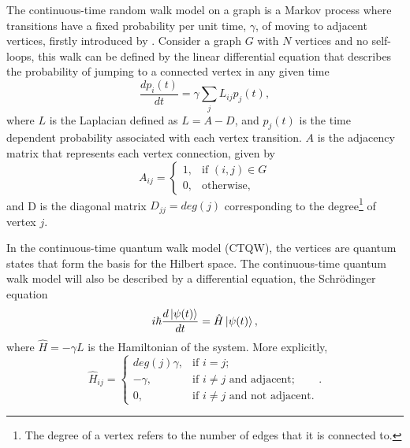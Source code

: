 \documentclass[../../dissertation.tex]{subfiles}
\begin{document}
The continuous-time random walk model on a graph is a Markov process where
transitions have a fixed probability per unit time, $\gamma$, of moving to
adjacent vertices, firstly introduced by \cite{montrollweiss1965}. Consider a
graph $G$ with $N$ vertices and no self-loops, this walk can be defined by the
linear differential equation that describes the probability of jumping to a
connected vertex in any given time 
\begin{equation}
	\frac{dp_i(t)}{dt} = \gamma \sum_j L_{ij} p_j(t), \label{eq:classicalContWalk}
\end{equation}
where $L$ is the Laplacian defined as $L = A - D$, and $p_j(t)$ is the time
dependent probability associated with each vertex transition. $A$ is the
adjacency matrix that represents each vertex connection, given by
\begin{equation}
	A_{ij} = \begin{cases} 1, & \mbox{if } (i,j)\in G \\ 0, & \mbox{otherwise,} \end{cases}
\end{equation}
and D is the diagonal matrix $D_{jj} = deg(j)$ corresponding to the
degree\footnote{The degree of a vertex refers to the number of edges that it is
connected to.} of vertex $j$.\par 

In the continuous-time quantum walk model (CTQW), the vertices are quantum
states that form the basis for the Hilbert space. The continuous-time quantum
walk model will also be described by a differential equation, the Schrödinger
equation
\begin{equation}
	i\hbar \frac{d\ket{\psi(t)}}{dt} = \hat{H} \ket{\psi(t)}, \label{shrodinger}
\end{equation}
where $\hat{H} = -\gamma L$ is the Hamiltonian of the system. More explicitly,
\begin{equation}
	\hat{H}_{ij} = \begin{cases} 
		deg(j)\gamma, & \mbox{if } i= j; \\ 
		-\gamma, & \mbox{if } i\neq j\mbox{ and adjacent};\\
		0, & \mbox{if } i\neq j\mbox{ and not adjacent}.
	\end{cases}.
	\label{Hamilt}
\end{equation}\par
\end{document}

